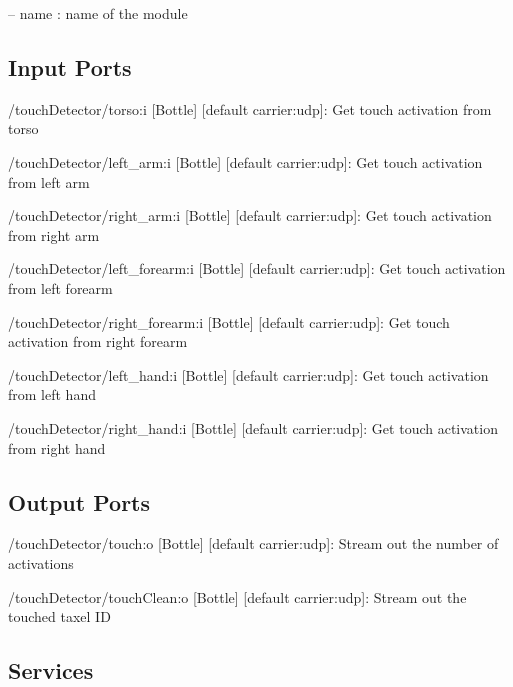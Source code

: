 \begin{DoxyItemize}
\item -- name \+: name of the module 
\end{DoxyItemize}\hypertarget{group__touchDetector_inputports_sec}{}\subsection{Input Ports}\label{group__touchDetector_inputports_sec}

\begin{DoxyItemize}
\item /touch\+Detector/torso\+:i \mbox{[}Bottle\mbox{]} \mbox{[}default carrier\+:udp\mbox{]}\+: Get touch activation from torso
\item /touch\+Detector/left\+\_\+arm\+:i \mbox{[}Bottle\mbox{]} \mbox{[}default carrier\+:udp\mbox{]}\+: Get touch activation from left arm
\item /touch\+Detector/right\+\_\+arm\+:i \mbox{[}Bottle\mbox{]} \mbox{[}default carrier\+:udp\mbox{]}\+: Get touch activation from right arm
\item /touch\+Detector/left\+\_\+forearm\+:i \mbox{[}Bottle\mbox{]} \mbox{[}default carrier\+:udp\mbox{]}\+: Get touch activation from left forearm
\item /touch\+Detector/right\+\_\+forearm\+:i \mbox{[}Bottle\mbox{]} \mbox{[}default carrier\+:udp\mbox{]}\+: Get touch activation from right forearm
\item /touch\+Detector/left\+\_\+hand\+:i \mbox{[}Bottle\mbox{]} \mbox{[}default carrier\+:udp\mbox{]}\+: Get touch activation from left hand
\item /touch\+Detector/right\+\_\+hand\+:i \mbox{[}Bottle\mbox{]} \mbox{[}default carrier\+:udp\mbox{]}\+: Get touch activation from right hand
\end{DoxyItemize}\hypertarget{group__touchDetector_outputports_sec}{}\subsection{Output Ports}\label{group__touchDetector_outputports_sec}

\begin{DoxyItemize}
\item /touch\+Detector/touch\+:o \mbox{[}Bottle\mbox{]} \mbox{[}default carrier\+:udp\mbox{]}\+: Stream out the number of activations
\item /touch\+Detector/touch\+Clean\+:o \mbox{[}Bottle\mbox{]} \mbox{[}default carrier\+:udp\mbox{]}\+: Stream out the touched taxel ID
\end{DoxyItemize}\hypertarget{group__touchDetector_services_sec}{}\subsection{Services}\label{group__touchDetector_services_sec}



